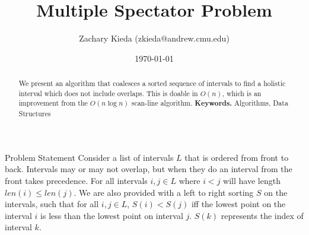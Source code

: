 \documentclass[11pt]{article}
\begin{document}
\title{Multiple Spectator Problem}
\author{Zachary Kieda (zkieda@andrew.cmu.edu)}
\date{\today}
\maketitle

\begin{abstract}
\setlength\parindent{0pt}
\noindent 
We present an algorithm that coalesces a sorted sequence of intervals to find a holistic interval which does not include overlaps. This is doable in $O(n)$, which is an improvement from the $O(n\log n)$ scan-line algorithm. 
\textbf{Keywords.} Algorithms, Data Structures
\end{abstract}
\begin{section}{Problem Statement}
Consider a list of intervals $L$ that is ordered from front to back. Intervals may or may not overlap, but when they do an interval from the front takes precedence. For all intervals $i, j \in L$ where $i < j$ will have length $len(i) \le len(j)$. We are also provided with a left to right sorting $S$ on the intervals, such that for all $i,j\in L$, $S(i) < S(j)$ iff the lowest point on the interval $i$ is less than the lowest point on interval $j$. $S(k)$ represents the index of interval $k$.
\end{section}
\end{document}
